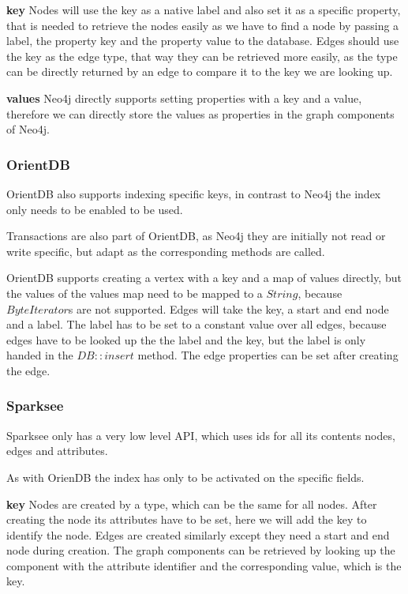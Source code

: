 \textbf{key} \newline
Nodes will use the key as a native label and also set it as a specific property,
that is needed to retrieve the nodes easily as we have to find a node by passing a label, the property key and the property value to the database.
Edges should use the key as the edge type,
that way they can be retrieved more easily,
as the type can be directly returned by an edge to compare it to the key we are looking up.

\textbf{values} \newline
Neo4j directly supports setting properties with a key and a value,
therefore we can directly store the values as properties in the graph components of Neo4j.

\subsubsection{OrientDB}
OrientDB also supports indexing specific keys,
in contrast to Neo4j the index only needs to be enabled to be used.

Transactions are also part of OrientDB,
as Neo4j they are initially not read or write specific,
but adapt as the corresponding methods are called.

OrientDB supports creating a vertex with a key and a map of values directly, but the values of the values map need to be mapped to a $ String $,
because $ ByteIterator $s are not supported.
Edges will take the key, a start and end node and a label.
The label has to be set to a constant value over all edges,
because edges have to be looked up the the label and the key,
but the label is only handed in the $ DB::insert $ method.
The edge properties can be set after creating the edge.

\subsubsection{Sparksee}
Sparksee only has a very low level API,
which uses ids for all its contents nodes, edges and attributes.

As with OrienDB the index has only to be activated on the specific fields.

\textbf{key} \newline
Nodes are created by a type,
which can be the same for all nodes.
After creating the node its attributes have to be set,
here we will add the key to identify the node.
Edges are created similarly except they need a start and end node during creation.
The graph components can be retrieved by looking up the component with the attribute identifier and the corresponding value,
which is the key.

